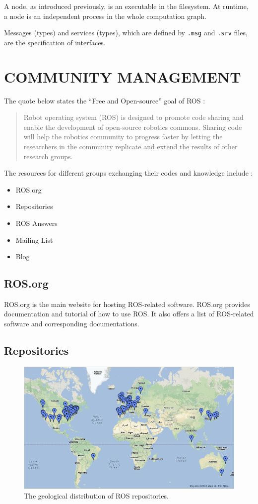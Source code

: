 \documentclass[a4paper, 10pt, conference]{ieeeconf}       %
\begin{document}
A node, as introduced previously, is an executable in the filesystem. At runtime, a node is an independent process in the whole computation graph.

Messages (types) and services (types), which are defined by \texttt{.msg} and \texttt{.srv} files, are the specification of interfaces.

\section{COMMUNITY MANAGEMENT}

The quote below states the ``Free and Open-source'' goal of ROS\cite{cousins_sharing_2010} :
\begin{quote}
  Robot operating system (ROS) is designed to promote code sharing and enable the development of open-source robotics commons. Sharing code will help the robotics community to progress faster by letting the researchers in the community replicate and extend the results of other research groups. 
\end{quote}

The resources for different groups exchanging their codes and knowledge include :
\begin{itemize}
  \item ROS.org
  \item Repositories
  \item ROS Answers
  \item Mailing List
  \item Blog
\end{itemize}

\subsection{ROS.org}
ROS.org is the main website for hosting ROS-related software. ROS.org provides documentation and tutorial of how to use ROS. It also offers a list of ROS-related software and corresponding documentations. 

\subsection{Repositories}

\begin{figure}[tbhp]
  \centering
  \includegraphics[width=.9\textwidth]{repos}
  \caption{The geological distribution of ROS repositories.}
  \label{fig:repos}
\end{figure}
\end{document}
